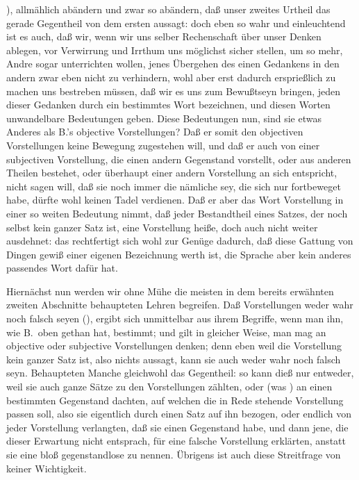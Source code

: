 \udgl ), allmählich abändern und zwar so abändern, daß unser zweites Urtheil das gerade Gegentheil von dem ersten aussagt: doch eben so wahr und einleuchtend ist es auch, daß wir, wenn wir uns selber Rechenschaft über unser Denken ablegen, vor Verwirrung und Irrthum uns möglichst sicher stellen, um so mehr, Andre sogar unterrichten wollen, jenes Übergehen des einen Gedankens in den andern zwar eben nicht zu verhindern, wohl aber erst dadurch ersprießlich zu machen uns bestreben müssen, daß wir es uns zum Bewußtseyn bringen, jeden dieser Gedanken durch ein bestimmtes Wort bezeichnen, und diesen Worten unwandelbare Bedeutungen geben. Diese Bedeutungen nun, sind sie etwas Anderes als B.'s objective Vorstellungen? Daß er somit den objectiven Vorstellungen keine Bewegung zugestehen will, und daß er auch von einer subjectiven Vorstellung, die einen andern Gegenstand vorstellt, oder aus anderen Theilen bestehet, oder überhaupt einer andern Vorstellung an sich entspricht, nicht sagen will, daß sie noch immer die nämliche sey, die sich nur fortbeweget habe, dürfte wohl keinen Tadel verdienen. Daß er aber das Wort Vorstellung in einer so weiten Bedeutung nimmt, daß jeder Bestandtheil eines Satzes, der noch selbst kein ganzer Satz ist, eine Vorstellung heiße, doch auch nicht weiter ausdehnet: das rechtfertigt sich wohl zur Genüge dadurch, daß diese Gattung von Dingen gewiß einer eigenen Bezeichnung werth ist, die Sprache aber kein anderes passendes Wort dafür hat. \par
Hiernächst nun werden wir ohne Mühe die meisten in dem bereits erwähnten zweiten Abschnitte behaupteten Lehren begreifen. Daß Vorstellungen weder wahr noch falsch seyen (), ergibt sich unmittelbar aus ihrem Begriffe, wenn man ihn, wie B.\ oben gethan hat, bestimmt; und gilt in gleicher Weise, man mag an objective oder subjective Vorstellungen denken; denn eben weil die Vorstellung kein ganzer Satz ist, also nichts aussagt, kann sie auch weder wahr noch falsch seyn. Behaupteten Manche gleichwohl das  Gegentheil: so kann dieß nur entweder, weil sie auch ganze Sätze zu den Vorstellungen zählten, oder (was ) an einen bestimmten Gegenstand dachten, auf welchen die in Rede stehende Vorstellung passen soll, also sie eigentlich durch einen Satz auf ihn bezogen, oder endlich von jeder Vorstellung verlangten, daß sie einen Gegenstand habe, und dann jene, die dieser Erwartung nicht entsprach, für eine falsche Vorstellung erklärten, anstatt sie eine bloß gegenstandlose zu nennen. Übrigens ist auch diese Streitfrage von keiner Wichtigkeit. \par
